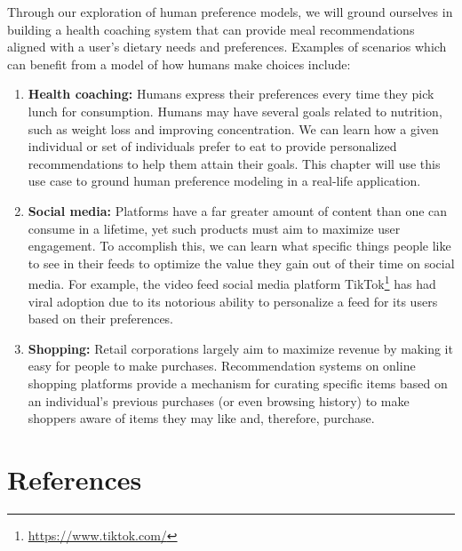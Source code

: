 \documentclass[
  letterpaper,
  numbers=noenddot,
  DIV=11]{scrreprt}
\theoremstyle{definition}
\theoremstyle{plain}
\theoremstyle{plain}
\theoremstyle{remark}
\DeclareRobustCommand{\href}[2]{#2\footnote{\url{#1}}}
\begin{document}
Through our exploration of human preference models, we will ground
ourselves in building a health coaching system that can provide meal
recommendations aligned with a user's dietary needs and preferences.
Examples of scenarios which can benefit from a model of how humans make
choices include:

\begin{enumerate}
\def\labelenumi{\arabic{enumi}.}
\item
  \textbf{Health coaching:} Humans express their preferences every time
  they pick lunch for consumption. Humans may have several goals related
  to nutrition, such as weight loss and improving concentration. We can
  learn how a given individual or set of individuals prefer to eat to
  provide personalized recommendations to help them attain their goals.
  This chapter will use this use case to ground human preference
  modeling in a real-life application.
\item
  \textbf{Social media:} Platforms have a far greater amount of content
  than one can consume in a lifetime, yet such products must aim to
  maximize user engagement. To accomplish this, we can learn what
  specific things people like to see in their feeds to optimize the
  value they gain out of their time on social media. For example, the
  video feed social media platform
  \href{https://www.tiktok.com/}{TikTok} has had viral adoption due to
  its notorious ability to personalize a feed for its users based on
  their preferences.
\item
  \textbf{Shopping:} Retail corporations largely aim to maximize revenue
  by making it easy for people to make purchases. Recommendation systems
  on online shopping platforms provide a mechanism for curating specific
  items based on an individual's previous purchases (or even browsing
  history) to make shoppers aware of items they may like and, therefore,
  purchase.
\end{enumerate}

\section*{References}\label{bibliography-2}

\end{document}
